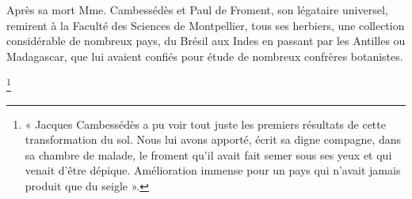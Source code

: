 Après sa mort Mme. Cambessédès et Paul de Froment, son légataire universel, remirent à la
Faculté des Sciences de Montpellier, tous ses herbiers, une collection considérable de
nombreux pays, du Brésil aux Indes en passant par les Antilles ou Madagascar, que lui
avaient confiés pour étude de nombreux confrères botanistes.

\footnote{« Jacques Cambessédès a pu voir tout juste les premiers résultats de cette transformation du sol. Nous lui
avons apporté, écrit sa digne compagne, dans sa chambre de malade, le froment qu’il avait fait semer sous ses
yeux et qui venait d’être dépique. Amélioration immense pour un pays qui n’avait jamais produit que du seigle ».}
